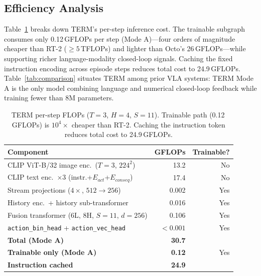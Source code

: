 \documentclass[letterpaper]{article} %
\begin{document}
\subsection{Efficiency Analysis}

Table~\ref{tab:flops} breaks down TERM's per-step inference cost. The trainable subgraph consumes only 0.12\,GFLOPs per step (Mode A)---four orders of magnitude cheaper than RT-2 (${\ge}5$\,TFLOPs) and lighter than Octo's 26\,GFLOPs---while supporting richer language-modality closed-loop signals. Caching the fixed instruction encoding across episode steps reduces total cost to 24.9\,GFLOPs. Table~\ref{tab:comparison} situates TERM among prior VLA systems: TERM Mode A is the only model combining language and numerical closed-loop feedback while training fewer than 8M parameters.

\begin{table}[t]
\centering
\setlength{\tabcolsep}{4pt}
\small
\begin{tabular}{p{3.9cm}rr}
\toprule
\textbf{Component} & \textbf{GFLOPs} & \textbf{Trainable?} \\
\midrule
CLIP ViT-B/32 image enc.\ ($T{=}3$, $224^2$) & 13.2 & No \\
CLIP text enc.\ $\times$3 (instr.+$E_{act}$+$E_{conseq}$) & 17.4 & No \\
\midrule
Stream projections ($4\times$, $512{\to}256$) & 0.002 & Yes \\
History enc.\ + history sub-transformer & 0.016 & Yes \\
Fusion transformer (6L, 8H, $S{=}11$, $d{=}256$) & 0.106 & Yes \\
\texttt{action\_bin\_head} + \texttt{action\_vec\_head} & ${<}0.001$ & Yes \\
\midrule
\textbf{Total (Mode A)} & \textbf{30.7} & \\
\textbf{Trainable only (Mode A)} & \textbf{0.12} & Yes \\
\textbf{Instruction cached} & \textbf{24.9} & \\
\bottomrule
\end{tabular}
\caption{TERM per-step FLOPs ($T{=}3$, $H{=}4$, $S{=}11$). Trainable path (0.12\,GFLOPs) is $10^4\times$ cheaper than RT-2. Caching the instruction token reduces total cost to 24.9\,GFLOPs.}
\label{tab:flops}
\end{table}
\end{document}
